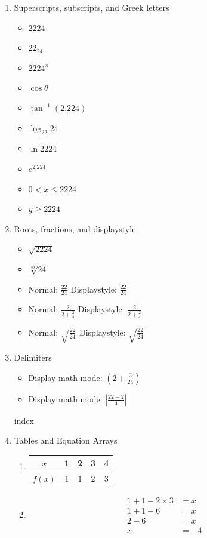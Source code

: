 \documentclass{article}
\begin{document}
\begin{enumerate}
    \item Superscripts, subscripts, and Greek letters
    \begin{itemize}
        \item $2224$
        \item $22_{24}$
        \item $2224^{\pi}$
        \item $\cos \theta$
        \item $\tan^{-1}(2.224)$
        \item $\log_{22}24$
        \item $\ln 2224$
        \item $e^{2.224}$
        \item $0 < x \leq 2224$
        \item $y \geq 2224$
    \end{itemize}

    \item Roots, fractions, and displaystyle
    \begin{itemize}
        \item $\sqrt{2224}$
        \item $\sqrt[22]{24}$
        \item Normal: $\frac{22}{24}$ Displaystyle: $\displaystyle\frac{22}{24}$
        \item Normal: $\frac{2}{2+ \frac{2}{4}}$ Displaystyle: $\displaystyle\frac{2}{2+ \frac{2}{4}}$
        \item Normal: $\sqrt{\frac{22}{24}}$ Displaystyle: $\displaystyle\sqrt{\frac{22}{24}}$
    \end{itemize}

    \item Delimiters
    \begin{itemize}
        \item Display math mode: $\displaystyle\left(2 + \frac{2}{24}\right)$
        \item Display math mode: $\displaystyle\left|\frac{22 - 2}{4}\right|$
    \end{itemize}

    index\item Tables and Equation Arrays
        \begin{enumerate}
        \item
        \begin{tabular}{|c||c|c|c|c|}
        \hline
        $x$ & 1 & 2 & 3 & 4 \\
        \hline
        $f(x)$ & 1 & 1 & 2 & 3 \\
        \hline
        \end{tabular}
        \item
        \begin{align}
        1 + 1 - 2 \times 3 &= x \tag{1} \\
        1 + 1 - 6 &= x \tag{2} \\
        2 - 6 &= x \tag{3} \\
        x &= -4 \tag{4}
        \end{align}
        \end{enumerate} 


\end{enumerate}
\end{document}
